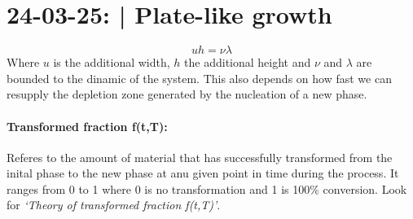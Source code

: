 \section{24-03-25: | Plate-like growth}
\begin{equation}
    uh = \nu \lambda
\end{equation}
Where $u$ is the additional width, $h$ the additional height and $\nu$ and $\lambda$ are bounded to the dinamic of the system. This also depends on how fast we can resupply the depletion zone generated by the nucleation of a new phase.

\paragraph{Transformed fraction f(t,T):} Referes to the amount of material that has successfully transformed from the inital phase to the new phase at anu given point in time during the process. It ranges from 0 to 1 where 0 is no transformation and 1 is 100\% conversion. Look for \textit{`Theory of transformed fraction f(t,T)'}.
